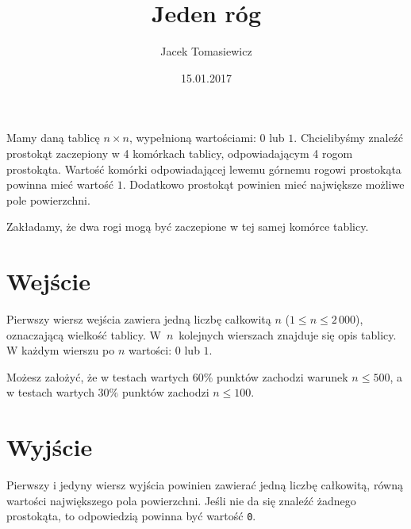 \documentclass[zad,zawodnik,utf8]{sinol}
\title{Jeden róg}
\author{Jacek Tomasiewicz}
\date{15.01.2017}
\begin{document}
  \begin{tasktext}%
Mamy daną tablicę $n \times n$, wypełnioną wartościami: $0$ lub $1$. 
Chcielibyśmy znaleźć prostokąt zaczepiony w 4 komórkach tablicy, odpowiadającym 4 rogom prostokąta.
Wartość komórki odpowiadającej lewemu górnemu rogowi prostokąta powinna mieć wartość $1$.
Dodatkowo prostokąt powinien mieć największe możliwe pole powierzchni.

Zakładamy, że dwa rogi mogą być zaczepione w tej samej komórce tablicy.

 \section{Wejście}
	
Pierwszy wiersz wejścia zawiera jedną liczbę całkowitą $n$ ($1 \leq n \leq 2\,000$),  
oznaczającą wielkość tablicy. W~$n$~kolejnych wierszach znajduje się opis tablicy. 
W każdym wierszu po $n$ wartości: $0$ lub $1$.

Możesz założyć, że w testach wartych $60\%$ punktów zachodzi warunek $n \leq 500$, 
a w testach wartych $30\%$ punktów zachodzi $n \leq 100$.

  \section{Wyjście}
	Pierwszy i jedyny wiersz wyjścia powinien zawierać jedną liczbę całkowitą, równą wartości największego pola powierzchni.
	Jeśli nie da się znaleźć żadnego prostokąta, to odpowiedzią powinna być wartość \texttt{0}.

     \makecompactexample

  \end{tasktext}
\end{document}
